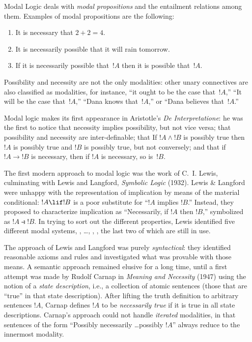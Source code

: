 \documentclass[../../../include/open-logic-section]{subfiles}
\begin{document}


Modal Logic deals with \emph{modal propositions} and the entailment
relations among them. Examples of modal propositions are the
following:
\begin{enumerate}
\item It is necessary that $2+2=4$.
\item It is necessarily possible that it will rain tomorrow.
\item If it is necessarily possible that~$!A$ then it is possible
  that~$!A$.
\end{enumerate}
Possibility and necessity are not the only modalities: other unary
connectives are also classified as modalities, for instance, ``it
ought to be the case that~$!A$,'' ``It will be the case that~$!A$,''
``Dana knows that~$!A$,'' or ``Dana believes that~$!A$.''

Modal logic makes its first appearance in Aristotle's \emph{De
  Interpretatione}: he was the first to notice that necessity implies
possibility, but not vice versa; that possibility and necessity are
inter-definable; that If $!A \land !B$ is possibly true then
$!A$ is possibly true and $!B$ is possibly true, but not
conversely; and that if $!A \to !B$ is necessary, then if
$!A$ is necessary, so is~$!B$.

The first modern approach to modal logic was the work of C.~I. Lewis,
culminating with Lewis and Langford, \emph{Symbolic Logic}
(1932). Lewis \& Langford were unhappy with the representation of
implication by means of the material conditional: $!A \lif !B$
is a poor substitute for ``$!A$ implies $!B$.'' Instead, they
proposed to characterize implication as ``Necessarily, if $!A$
then $!B$,'' symbolized as $!A \strictif !B$. In trying to
sort out the different properties, Lewis identified five different
modal systems, , \ldots, , , the last
two of which are still in use.

The approach of Lewis and Langford was purely \emph{syntactical}: they
identified reasonable axioms and rules and investigated what was
provable with those means. A semantic approach remained elusive for a
long time, until a first attempt was made by Rudolf Carnap in
\emph{Meaning and Necessity} (1947) using the notion of a \emph{state
  description}, i.e., a collection of atomic sentences (those that are
``true'' in that state description). After lifting the truth
definition to arbitrary sentences $!A$, Carnap defines $!A$
to be \emph{necessarily true} if it is true in all state
descriptions. Carnap's approach could not handle \emph{iterated}
modalities, in that sentences of the form ``Possibly necessarily
\ldots possibly $!A$'' always reduce to the innermost modality.
\end{document}
